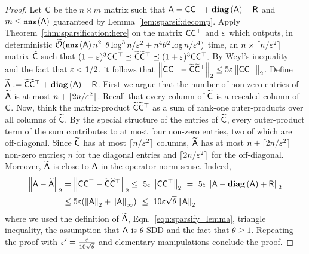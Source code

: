 \begin{proof}
%
Let ${\mathsf{C} }$ be the $n\times m$ matrix such that ${\mathsf{A} } = {\mathsf{C} }{\mathsf{C} }^\top +\operatorname{\textbf{diag}}\left({\mathsf{A} }\right) - {\mathsf{R} }$ and $m\leq \operatorname{\textbf{\footnotesize nnz}}\left({\mathsf{A} }\right)$ guaranteed by Lemma~\ref{lem:sparsif:decomp}. Apply Theorem~\ref{thm:sparsification:here} on the matrix ${\mathsf{C} }{\mathsf{C} }^\top$  and $\varepsilon$ which outputs, in deterministic $\widetilde{\mathcal{O}}(\operatorname{\textbf{\footnotesize nnz}}\left({\mathsf{A} }\right) n^2$
$ \theta \log^3 n  /\varepsilon^2 + n^4 \theta^2 \log n /\varepsilon^4)$ time, an $n\times \lceil n/\varepsilon^2\rceil$ matrix $\widetilde{{\mathsf{C} }}$ such that $(1-\varepsilon)^3 {\mathsf{C} }{\mathsf{C} }^\top \preceq \widetilde{{\mathsf{C} }}\widetilde{{\mathsf{C} }}^\top \preceq (1+\varepsilon)^3 {\mathsf{C} }{\mathsf{C} }^\top.$ By Weyl's inequality~\cite[Theorem~$4.3.1$]{book:matrix_analysis:HornJohnson} and the fact that $\varepsilon<1/2$, it follows that $\left\|{\mathsf{C} }{\mathsf{C} }^\top - \widetilde{{\mathsf{C} }}\widetilde{{\mathsf{C} }}^\top\right\|_2 \leq 5 \varepsilon \left\|{\mathsf{C} }{\mathsf{C} }^\top\right\|_2$. Define $\widetilde{{\mathsf{A} }}:= \widetilde{{\mathsf{C} }}\widetilde{{\mathsf{C} }}^\top + \operatorname{\textbf{diag}}\left({\mathsf{A} }\right) - {\mathsf{R} }$. First we argue that the number of non-zero entries of $\widetilde{{\mathsf{A} }}$ is at most $n+ \lceil 2n/\varepsilon^2 \rceil $. Recall that every column of $\widetilde{{\mathsf{C} }}$ is a rescaled column of ${\mathsf{C} }$. Now, think the matrix-product $\widetilde{{\mathsf{C} }}\widetilde{{\mathsf{C} }}^\top$ as a sum of rank-one outer-products over all columns of $\widetilde{{\mathsf{C} }}$. By the special structure of the entries of $\widetilde{{\mathsf{C} }}$, every outer-product term of the sum contributes to at most four non-zero entries, two of which are off-diagonal. Since $\widetilde{{\mathsf{C} }}$ has at most $\lceil n/\varepsilon^2 \rceil$ columns, $\widetilde{{\mathsf{A} }}$ has at most $n + \lceil 2 n/\varepsilon^2\rceil$ non-zero entries; $n$ for the diagonal entries and $\lceil 2 n/\varepsilon^2\rceil$ for the off-diagonal. Moreover, $\widetilde{{\mathsf{A} }}$ is close to ${\mathsf{A} }$ in the operator norm sense. Indeed,
\begin{align*}
	\norm{\matA - \widetilde{\matA} } &   =   \norm{\matC\matC^\top - \widetilde{\matC}\widetilde{\matC}^\top}  \leq\ 5\eps\norm{\matC\matC^\top } \   =  \  5\eps\norm{\matA - \diag{\matA} +\matR }\\
	  						  & \leq  5\eps(\norm{\matA} + \infnorm{\matA}) \ \leq\ 10 \eps \sqrt{\theta}\norm{\matA}
\end{align*}
where we used the definition of $\widetilde{{\mathsf{A} }}$, Eqn.~\eqref{eqn:sparsify_lemma}, triangle inequality, the assumption that ${\mathsf{A} }$ is $\theta$-SDD and the fact that $\theta \geq 1$. Repeating the proof with $\varepsilon' =\frac{\varepsilon}{10\sqrt{\theta}}$ and elementary manipulations conclude the proof.
\end{proof}
%
%
